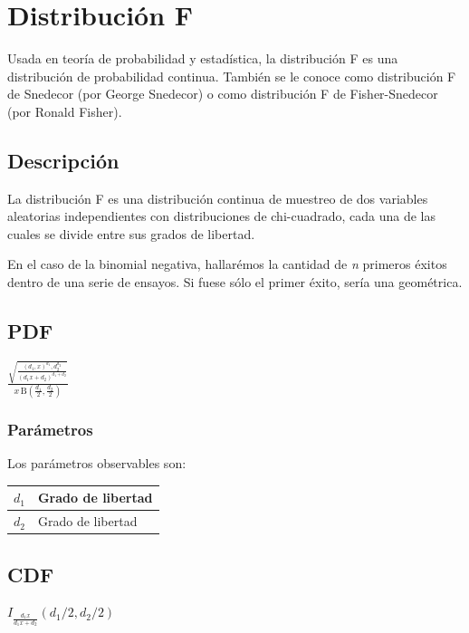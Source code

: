 \chapter{Distribución F}
Usada en teoría de probabilidad y estadística, la distribución F es una distribución de probabilidad continua. También se le conoce como distribución F de Snedecor (por George Snedecor) o como distribución F de Fisher-Snedecor (por Ronald Fisher).


\section{Descripción}
La distribución F es una distribución continua de muestreo de dos variables aleatorias independientes con distribuciones de chi-cuadrado, cada una de las cuales se divide entre sus grados de libertad. \cite{wiki:2}


En el caso de la binomial negativa, hallarémos la cantidad de \textit{n} primeros éxitos dentro de una serie de ensayos. Si fuese sólo el primer éxito, sería una geométrica.

\section{PDF}
\begin{center}
$\frac {\sqrt {\frac {(d_{1},x)^{d_{1}},d_{2}^{d_{2}}}{(d_{1}x+d_{2})^{d_{1}+d_{2}}}}} {x\,\mathrm {B} ({\frac {d_{1}}{2}},{\frac {d_{2}}{2}})}$
\end{center}
\subsection{Parámetros}
Los parámetros observables son:

\begin{center}
	\begin{tabular} {| l | l |}
		\hline
		$d_1$ & Grado de libertad\\ \hline
		$d_2$ & Grado de libertad\\ \hline		
	\end{tabular}
\end{center}

\section{CDF}
\begin{center}
	$I_{\frac{d_1 x}{d_1 x + d_2}}(d_1/2, d_2/2)\!$
\end{center}

